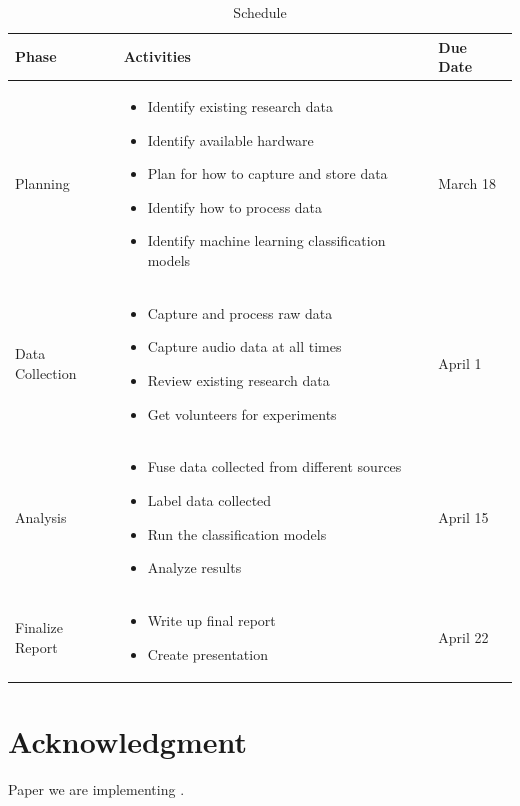 \documentclass[conference]{IEEEtran}
\begin{document}
\begin{table}[htbp]
	\caption{Schedule}
	\begin{center}
		\begin{tabular}{| m{1.2cm} | m{4cm} | m{1.2cm} |}
			\hline
			\textbf{Phase} & \textbf{Activities} & \textbf{Due Date} \\
			\hline
			Planning & 
			\begin{itemize}
				\item Identify existing research data
				\item Identify available hardware
				\item Plan for how to capture and store data
				\item Identify how to process data
				\item Identify machine learning classification models
			\end{itemize} &
			March 18 \\
			\hline
			
			Data Collection & 
			\begin{itemize}
				\item Capture and process raw data
				\item Capture audio data at all times
				\item Review existing research data
				\item Get volunteers for experiments
			\end{itemize} & 
			April 1 \\
			\hline
			
			Analysis & 
			\begin{itemize}
				\item Fuse data collected from different sources
				\item Label data collected
				\item Run the classification models
				\item Analyze results
			\end{itemize} & 
			April 15 \\
			\hline
			
			Finalize Report & 
			\begin{itemize}
				\item Write up final report
				\item Create presentation
			\end{itemize} & 
			April 22 \\
			\hline
		\end{tabular}
		\label{tab: Schedule}
	\end{center}
\end{table}

\section*{Acknowledgment}

Paper we are implementing \cite{2022_Leveraging_sound}.

\nocite{*}
\printbibliography
\end{document}
